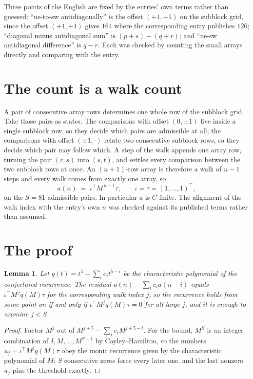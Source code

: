 \documentclass[11pt,a4paper]{article}
\theoremstyle{plain}
\newtheorem{lemma}[theorem]{Lemma}
\theoremstyle{definition}
\begin{document}
Three points of the English are fixed by the entries' own terms rather than guessed:
``ne-to-sw antidiagonally'' is the offset $(+1,-1)$ on the subblock grid, since the offset
$(+1,+1)$ gives $164$ where the corresponding entry publishes $126$; ``diagonal minus
antidiagonal sum'' is $(p+s)-(q+r)$; and ``ne-sw antidiagonal difference'' is $q-r$. Each was
checked by counting the small arrays directly and comparing with the entry.

\section{The count is a walk count}

A pair of consecutive array rows determines one whole row of the subblock grid. Take those
pairs as states. The comparisons with offset $(0,\pm1)$ live inside a single subblock row, so
they decide which pairs are admissible at all; the comparisons with offset $(\pm1,\cdot)$
relate two consecutive subblock rows, so they decide which pair may follow which. A step of the
walk appends one array row, turning the pair $(r,s)$ into $(s,t)$, and settles every comparison
between the two subblock rows at once. An $(n+1)$-row array is therefore a walk of $n-1$ steps
and every walk comes from exactly one array, so
\[
a(n)\;=\;\iota^{\!\top}M^{\,n-1}\tau,\qquad \iota=\tau=(1,\dots,1)^{\!\top},
\]
on the $S=81$ admissible pairs. In particular $a$ is $C$-finite. The alignment of the walk
index with the entry's own $n$ was checked against its published terms rather than assumed.

\section{The proof}

\begin{lemma}\label{lem:crit}
Let $q(t)=t^{5}-\sum_i c_it^{5-i}$ be the characteristic polynomial of the
conjectured recurrence. The residual $a(n)-\sum_ic_ia(n-i)$ equals
$\iota^{\!\top}M^{\,j}q(M)\tau$ for the corresponding walk index $j$, so the recurrence
holds from some point on if and only if $\iota^{\!\top}M^{j}q(M)\tau=0$ for all large $j$,
and it is enough to examine $j<S$.
\end{lemma}

\begin{proof}
Factor $M^{j}$ out of $M^{j+5}-\sum_ic_iM^{j+5-i}$. For the bound, $M^{S}$
is an integer combination of $I,M,\dots,M^{S-1}$ by Cayley--Hamilton, so the numbers
$u_j=\iota^{\!\top}M^{j}q(M)\tau$ obey the monic recurrence given by the characteristic
polynomial of $M$; $S$ consecutive zeros force every later one, and the last nonzero $u_j$
pins the threshold exactly.
\end{proof}
\end{document}

